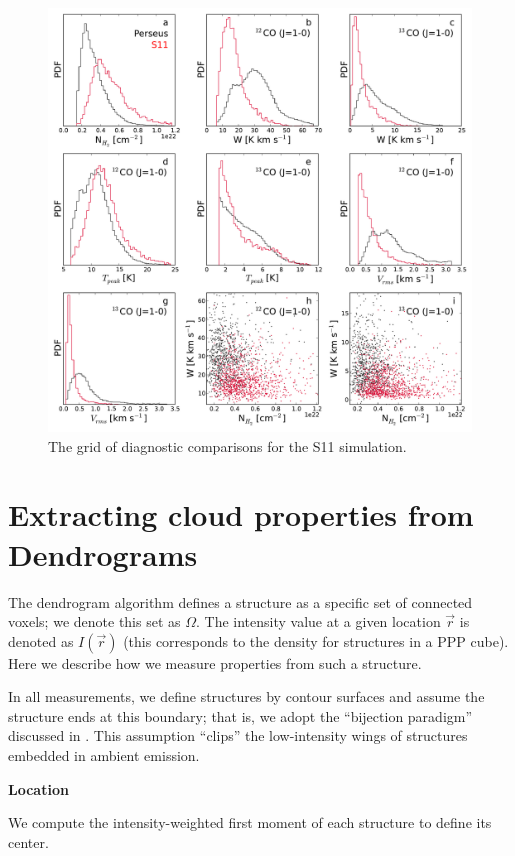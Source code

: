 {\begin{figure}
\includegraphics[width=6in]{figures/diagnostic_S11}
\caption{The grid of diagnostic comparisons for the S11 simulation.}
\label{fig:dgrid_rahul}
\end{figure}

\section{Extracting cloud properties from Dendrograms}

The dendrogram algorithm defines a structure as a specific set of
connected voxels; we denote this set as $\Omega$. The intensity value at a given location $\vec{r}$ is denoted as $I(\vec{r})$ (this corresponds to the density for structures in a PPP cube). Here we describe how we measure properties from such a structure.

In all measurements, we define structures by contour surfaces and assume the structure ends at this boundary; that is, we adopt the ``bijection paradigm'' discussed in \cite{http://adsabs.harvard.edu/abs/2008ApJ...679.1338R}. This
assumption ``clips'' the low-intensity wings of structures embedded in ambient emission.

\textbf{Location}

We compute the intensity-weighted first moment of each
structure to define its center.

}
